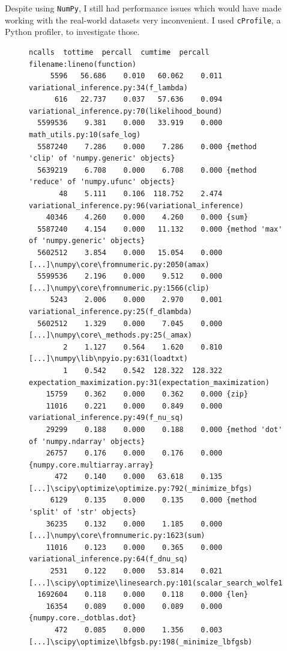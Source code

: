 \documentclass[12pt,a4paper,twoside,openright]{report}
\begin{document}
Despite using \texttt{NumPy}, I still had performance issues which would have made working with the real-world datasets very inconvenient. I used \texttt{cProfile}, a Python profiler, to investigate those.

\begin{figure}
\begin{Verbatim}[fontsize=\scriptsize]
   ncalls  tottime  percall  cumtime  percall filename:lineno(function)
     5596   56.686    0.010   60.062    0.011 variational_inference.py:34(f_lambda)
      616   22.737    0.037   57.636    0.094 variational_inference.py:70(likelihood_bound)
  5599536    9.381    0.000   33.919    0.000 math_utils.py:10(safe_log)
  5587240    7.286    0.000    7.286    0.000 {method 'clip' of 'numpy.generic' objects}
  5639219    6.708    0.000    6.708    0.000 {method 'reduce' of 'numpy.ufunc' objects}
       48    5.111    0.106  118.752    2.474 variational_inference.py:96(variational_inference)
    40346    4.260    0.000    4.260    0.000 {sum}
  5587240    4.154    0.000   11.132    0.000 {method 'max' of 'numpy.generic' objects}
  5602512    3.854    0.000   15.054    0.000 [...]\numpy\core\fromnumeric.py:2050(amax)
  5599536    2.196    0.000    9.512    0.000 [...]\numpy\core\fromnumeric.py:1566(clip)
     5243    2.006    0.000    2.970    0.001 variational_inference.py:25(f_dlambda)
  5602512    1.329    0.000    7.045    0.000 [...]\numpy\core\_methods.py:25(_amax)
        2    1.127    0.564    1.620    0.810 [...]\numpy\lib\npyio.py:631(loadtxt)
        1    0.542    0.542  128.322  128.322 expectation_maximization.py:31(expectation_maximization)
    15759    0.362    0.000    0.362    0.000 {zip}
    11016    0.221    0.000    0.849    0.000 variational_inference.py:49(f_nu_sq)
    29299    0.188    0.000    0.188    0.000 {method 'dot' of 'numpy.ndarray' objects}
    26757    0.176    0.000    0.176    0.000 {numpy.core.multiarray.array}
      472    0.140    0.000   63.618    0.135 [...]\scipy\optimize\optimize.py:792(_minimize_bfgs)
     6129    0.135    0.000    0.135    0.000 {method 'split' of 'str' objects}
    36235    0.132    0.000    1.185    0.000 [...]\numpy\core\fromnumeric.py:1623(sum)
    11016    0.123    0.000    0.365    0.000 variational_inference.py:64(f_dnu_sq)
     2531    0.122    0.000   53.814    0.021 [...]\scipy\optimize\linesearch.py:101(scalar_search_wolfe1)
  1692604    0.118    0.000    0.118    0.000 {len}
    16354    0.089    0.000    0.089    0.000 {numpy.core._dotblas.dot}
      472    0.085    0.000    1.356    0.003 [...]\scipy\optimize\lbfgsb.py:198(_minimize_lbfgsb)

\end{Verbatim}
\end{figure}
\end{document}
